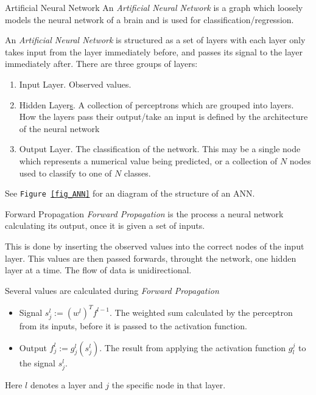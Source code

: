 \documentclass[11pt,a4paper]{article}
\begin{document}
  \begin{definition}{Artificial Neural Network}
    An \textit{Artificial Neural Network} is a graph which loosely models the neural network of a brain and is used for classification/regression.
    \par An \textit{Artificial Neural Network} is structured as a set of layers with each layer only takes input from the layer immediately before, and passes its signal to the layer immediately after. There are three groups of layers:
    \begin{enumerate}
      \item Input Layer. Observed values.
      \item Hidden Layer\underline{s}. A collection of perceptrons which are grouped into layers. How the layers pass their output/take an input is defined by the architecture of the neural network
      \item Output Layer. The classification of the network. This may be a single node which represents a numerical value being predicted, or a collection of $N$ nodes used to classify to one of $N$ classes.
    \end{enumerate}
    See \texttt{Figure \ref{fig_ANN}} for an diagram of the structure of an ANN.
  \end{definition}

  \begin{definition}{Forward Propagation}
    \textit{Forward Propagation} is the process a neural network calculating its output, once it is given a set of inputs.
    \par This is done by inserting the observed values into the correct nodes of the input layer. This values are then passed forwards, throught the network, one hidden layer at a time. The flow of data is unidirectional.
    \par Several values are calculated during \textit{Forward Propagation}
    \begin{itemize}
      \item Signal $s_j^l:=(w^l)^Tf^{l-1}$. The weighted sum calculated by the perceptron from its inputs, before it is passed to the activation function.
      \item Output $f_j^l:=g_j^l(s_j^l)$. The result from applying the activation function $g^j_l$ to the signal $s_j^l$.
    \end{itemize}
    Here $l$ denotes a layer and $j$ the specific node in that layer.
  \end{definition}
\end{document}
